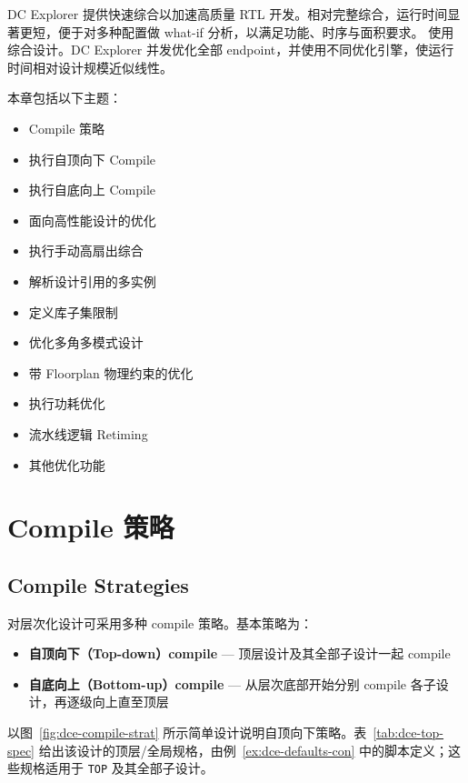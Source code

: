 \label{chap:opt}

DC Explorer 提供快速综合以加速高质量 RTL 开发。相对完整综合，运行时间显著更短，便于对多种配置做 what-if 分析，以满足功能、时序与面积要求。
使用  综合设计。DC Explorer 并发优化全部 endpoint，并使用不同优化引擎，使运行时间相对设计规模近似线性。

本章包括以下主题：
\begin{itemize}
  \item Compile 策略
  \item 执行自顶向下 Compile
  \item 执行自底向上 Compile
  \item 面向高性能设计的优化
  \item 执行手动高扇出综合
  \item 解析设计引用的多实例
  \item 定义库子集限制
  \item 优化多角多模式设计
  \item 带 Floorplan 物理约束的优化
  \item 执行功耗优化
  \item 流水线逻辑 Retiming
  \item 其他优化功能
\end{itemize}

\section{Compile 策略}
\subsection*{Compile Strategies}

对层次化设计可采用多种 compile 策略。基本策略为：
\begin{itemize}
  \item \textbf{自顶向下（Top-down）compile} — 顶层设计及其全部子设计一起 compile
  \item \textbf{自底向上（Bottom-up）compile} — 从层次底部开始分别 compile 各子设计，再逐级向上直至顶层
\end{itemize}

以图~\ref{fig:dce-compile-strat} 所示简单设计说明自顶向下策略。表~\ref{tab:dce-top-spec} 给出该设计的顶层/全局规格，由例~\ref{ex:dce-defaults-con} 中的脚本定义；这些规格适用于 \texttt{TOP} 及其全部子设计。



